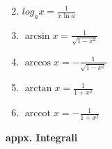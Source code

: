 \begin{center}
\begin{small}
\begin{enumerate}
\begin{math}
            \end{math}
            \item \begin{math}
                log_a x = \frac{1}{x \ln a}
            \end{math}
            \item \begin{math}
                \arcsin x = \frac{1}{\sqrt {1 - x^2}}
            \end{math}
            \item \begin{math}
                \arccos x = - \frac{1}{\sqrt{1 - x^2}}
            \end{math}
            \item \begin{math}
                \arctan x = \frac{1}{1 + x^2}
            \end{math}
            \item \begin{math}
                \operatorname{arccot}x = -\frac{1}{1 + x^2}
            \end{math}
        \end{enumerate}
    \end{small}
\end{center}
\textbf{appx. Integrali}
